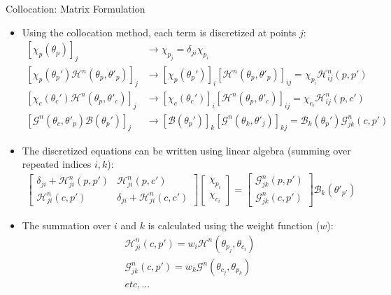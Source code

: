 \documentclass[8pt]{beamer}
\begin{document}
\begin{frame}{\color{white} Collocation: Matrix Formulation}
\begin{itemize}
    \item Using the collocation method, each term is discretized at points $j$:
    \begin{align}
         \left[\chi_p(\theta_p) \right]_j &\xrightarrow{} \chi_{p_j} = \delta_{ji}\chi_{p_i}\\
         \left[\chi_p(\theta_p') \mathcal{H}^n(\theta_p, \theta'_p) \right]_j &\xrightarrow{} \left[\chi_p(\theta_p') \right]_i \left[ \mathcal{H}^n(\theta_p, \theta'_p) \right]_{ij} = \chi_{p_i} \mathcal{H}^n_{ij}(p,p') \\
         \left[\chi_c(\theta_c') \mathcal{H}^n(\theta_p, \theta'_c) \right]_j &\xrightarrow{} \left[\chi_c(\theta_c') \right]_i \left[ \mathcal{H}^n(\theta_p, \theta'_c) \right]_{ij} = \chi_{c_i} \mathcal{H}^n_{ij}(p,c') \\
         \left[\mathcal{G}^n(\theta_c, \theta'_p) \mathcal{B}(\theta_p')  \right]_j &\xrightarrow{} \left[\mathcal{B}(\theta_p') \right]_k \left[ \mathcal{G}^n(\theta_k, \theta'_j) \right]_{kj} = \mathcal{B}_k(\theta_p') \mathcal{G}^n_{jk}(c,p')
    \end{align}
    \item The discretized equations can be written using linear algebra (summing over repeated indices $i, k$):
    \begin{align}
    \begin{bmatrix}
    \delta_{ji} + \mathcal{H}_{ji}^{n}(p,p') & \mathcal{H}_{ji}^{n}(p,c') \\
    \mathcal{H}_{ji}^{n}(c,p') & \delta_{ji} + \mathcal{H}_{ji}^{n}(c,c')
    \end{bmatrix}
    \begin{bmatrix}
    \chi_{p_i} \\
    \chi_{c_i}
    \end{bmatrix}
    =
    \begin{bmatrix}
    \mathcal{G}_{jk}^{n}(p,p') \\
    \mathcal{G}_{jk}^{n}(c,p')
    \end{bmatrix}
    \mathcal{B}_{k}(\theta'_{p'}) \label{eq:nonsingular_matrix}
    \end{align}
    \item The summation over $i$ and $k$ is calculated using the weight function ($w$):
    \begin{align}
         \mathcal{H}^n_{ji}(c,p') = w_i \mathcal{H}^n(\theta_{p_j},\theta_{c_i}) \\
         \mathcal{G}^n_{jk}(c,p') = w_k \mathcal{G}^n(\theta_{c_j},\theta_{p_k}) \\
         etc,... \nonumber
    \end{align}

\end{itemize}
\end{frame}
\end{document}
